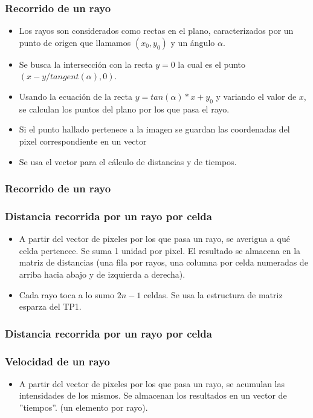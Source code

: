 \documentclass[11pt]{beamer}
\begin{document}
\begin{frame}
\frametitle{Recorrido de un rayo}
\begin{itemize}
\item Los rayos son considerados como rectas en el plano, caracterizados por un punto de origen que llamamos $(x_{0},y_{0})$ y un ángulo $\alpha$.
\item Se busca la intersección con la recta $y=0$ la cual es el punto $(x-y/tangent(\alpha),0)$.
\item Usando la ecuación de la recta $y=tan(\alpha)*x+y_{0}$ y variando el valor de $x$, se calculan los puntos del plano por los que pasa el rayo.
\item Si el punto hallado pertenece a la imagen se guardan las coordenadas del pixel correspondiente en un vector
\item Se usa el vector para el cálculo de distancias y de tiempos.
\end{itemize}
\end{frame}

\begin{frame}
\frametitle{Recorrido de un rayo}
\end{frame}



\begin{frame}
\frametitle{Distancia recorrida por un rayo por celda}
\begin{itemize}
\item A partir del vector de pixeles por los que pasa un rayo, se averigua a qué celda pertenece. Se suma 1 unidad por pixel. El resultado se almacena en la matriz de distancias (una fila por rayos, una columna por celda numeradas de arriba hacia abajo y de izquierda a derecha).
\item Cada rayo toca a lo sumo $2n-1$ celdas. Se usa la estructura de matriz esparza del TP1.
\end{itemize}
\end{frame}


\begin{frame}
\frametitle{Distancia recorrida por un rayo por celda}
\end{frame}


\begin{frame}
\frametitle{Velocidad de un rayo}
\begin{itemize}
\item A partir del vector de pixeles por los que pasa un rayo, se acumulan las intensidades de los mismos. Se almacenan los resultados en un vector de ''tiempos''. (un elemento por rayo).
\end{itemize}
\end{frame}
\end{document}
